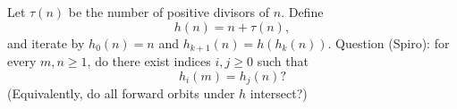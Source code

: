 Let $\tau(n)$ be the number of positive divisors of $n$.
Define
$$h(n)=n+\tau(n),$$
and iterate by $h_0(n)=n$ and $h_{k+1}(n)=h(h_k(n))$.
Question (Spiro): for every $m,n\ge1$, do there exist indices $i,j\ge0$ such that
$$h_i(m)=h_j(n)?$$
(Equivalently, do all forward orbits under $h$ intersect?)
